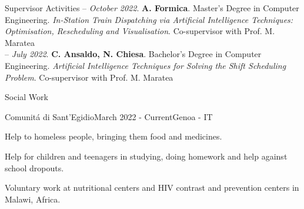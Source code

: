 \documentclass{resume} %
\begin{document}
\begin{rSection}{Supervisor Activities}
-- \textit{October 2022}. \textbf{A. Formica}. Master's Degree in Computer Engineering. \textit{In-Station Train Dispatching via Artificial Intelligence Techniques: Optimisation, Rescheduling and Visualisation}. Co-supervisor with Prof. M. Maratea\\
-- \textit{July 2022}. \textbf{C. Ansaldo, N. Chiesa}. Bachelor's Degree in Computer Engineering. \textit{Artificial Intelligence Techniques for Solving the Shift Scheduling Problem}. Co-supervisor with Prof. M. Maratea
\end{rSection}

\begin{rSection}{Social Work}

\begin{rSubsection}{Comunit\'a di Sant'Egidio}{March 2022 - Current}{}{Genoa - IT}
\item Help to homeless people, bringing them food and medicines.
\item Help for children and teenagers in studying, doing homework and help against school dropouts.
\item Voluntary work at nutritional centers and HIV contrast and prevention centers in Malawi, Africa.
\end{rSubsection}

\end{rSection}

\break
\end{document}
